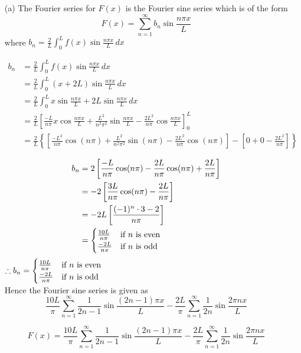 \documentclass[12pt]{scrartcl}
\newcommand{\disp}{\displaystyle}
\begin{document}
\begin{soln}
\begin{enumerate}
	\item[(a)] The Fourier series for $F(x)$ is the Fourier sine series which is of the form 
	\[
	F(x) = \sum_{n=1}^{\infty} b_n \sin \frac{n\pi x}{L} 
\]
where $\disp b_n = \frac2L \int_{0}^{L} f(x) \sin \frac{n\pi x}{L}\, dx$

\begin{align*}
	b_n & = \frac2L \int_{0}^{L} f(x) \sin \frac{n\pi x}{L}\, dx \\
		& = \frac2L \int_{0}^{L} (x + 2L) \sin \frac{n\pi x}{L}\, dx \\
		& = \frac2L \int_{0}^{L} x \sin \frac{n\pi x}{L} + 2L \sin \frac{n\pi x}{L} \, dx \\
		& = \frac2L \left[ \frac{-L}{n\pi}x\cos \frac{n\pi x}{L} + \frac{L^2}{n^2\pi^2}\sin \frac{n\pi x}{L} - \frac{2L^2}{n\pi} \cos \frac{n\pi x}{L} \right]_{0}^{L} \\
		& = \frac2L \left\{ \left[ \frac{-L^2}{n\pi}\cos (n\pi) + \frac{L^2}{n^2\pi^2}\sin (n\pi) - \frac{2L^2}{n\pi} \cos (n\pi) \right] - \left[ 0 + 0 - \frac{2L^2}{n \pi} \right] \right\} 
\end{align*}

\begin{align*}
		b_n & = 2 \left[ \frac{-L}{n\pi}\cos (n\pi) - \frac{2L}{n\pi} \cos (n\pi) + \frac{2L}{n \pi} \right] \\
		& = - 2 \left[ \frac{3L}{n\pi} \cos (n\pi) - \frac{2L}{n \pi} \right] \\
		& = - 2L \left[ \frac{(-1)^n \cdot 3 - 2}{n\pi} \right] \\
		& = \begin{cases}
				\frac{10L}{n\pi} & \text{if $n$ is even} \\[1\baselineskip]
				\frac{-2L}{n\pi} & \text{if $n$ is odd} 
\end{cases}
\end{align*}
$\disp \therefore b_n = \begin{cases}
				\frac{10L}{n\pi} & \text{if $n$ is even} \\[1\baselineskip]
				\frac{-2L}{n\pi} & \text{if $n$ is odd} 
\end{cases} $ \\
Hence the Fourier sine series is given as 
	\[
	\frac{10L}{\pi}\sum_{n = 1}^{\infty} \frac{1}{2n -1} \sin \frac{(2n-1)\pi x}{L} - \frac{2L}{\pi}\sum_{n = 1}^{\infty} \frac{1}{2n} \sin \frac{2\pi nx}{L} 
\]

\begin{mdframed}[style=mybox]
	\[
	F(x) = \frac{10L}{\pi}\sum_{n = 1}^{\infty} \frac{1}{2n -1} \sin \frac{(2n-1)\pi x}{L} - \frac{2L}{\pi}\sum_{n = 1}^{\infty} \frac{1}{2n} \sin \frac{2\pi nx}{L} 
\] 
\end{mdframed}


\end{enumerate}
\end{soln}
\end{document}
